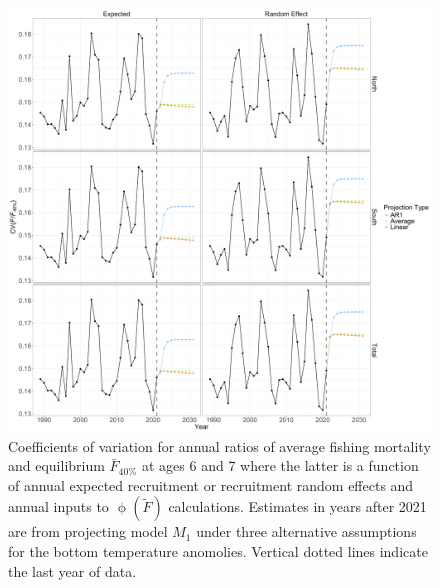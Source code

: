 \documentclass[
]{article}
\begin{document}
\begin{figure}

{\centering \includegraphics[height=0.95\textheight]{proj_F_status_CV} 

}

\caption{Coefficients of variation for annual ratios of average fishing mortality and equilibrium $\bar{F}_{40\%}$ at ages 6 and 7 where the latter is a function of annual expected recruitment or recruitment random effects and annual inputs to $\upphi(\widetilde{F})$ calculations. Estimates in years after 2021 are from projecting model $M_1$ under three alternative assumptions for the bottom temperature anomolies. Vertical dotted lines indicate the last year of data.}\label{fig:annual-F-status-cvs}
\end{figure}
\end{document}
